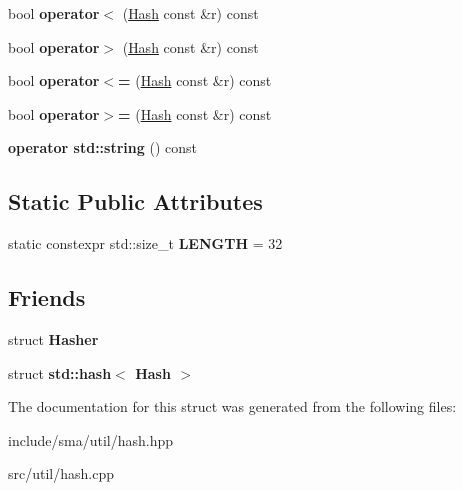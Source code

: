 \begin{DoxyCompactItemize}
\item 
\hypertarget{structsma_1_1Hash_aa811d9fb7dedacd1c4fb6942208f3b10}{bool {\bfseries operator$<$} (\hyperlink{structsma_1_1Hash}{Hash} const \&r) const }\label{structsma_1_1Hash_aa811d9fb7dedacd1c4fb6942208f3b10}

\item 
\hypertarget{structsma_1_1Hash_a15198c79f588abde88bb159708a4cab9}{bool {\bfseries operator$>$} (\hyperlink{structsma_1_1Hash}{Hash} const \&r) const }\label{structsma_1_1Hash_a15198c79f588abde88bb159708a4cab9}

\item 
\hypertarget{structsma_1_1Hash_a2d0c5d092d0007f0a6391559f0a5f722}{bool {\bfseries operator$<$=} (\hyperlink{structsma_1_1Hash}{Hash} const \&r) const }\label{structsma_1_1Hash_a2d0c5d092d0007f0a6391559f0a5f722}

\item 
\hypertarget{structsma_1_1Hash_a7c7a9f933dd3af05335a70a09a53a897}{bool {\bfseries operator$>$=} (\hyperlink{structsma_1_1Hash}{Hash} const \&r) const }\label{structsma_1_1Hash_a7c7a9f933dd3af05335a70a09a53a897}

\item 
\hypertarget{structsma_1_1Hash_a68bbcc1f267c5dc78a7f7005a84d2d1d}{{\bfseries operator std\-::string} () const }\label{structsma_1_1Hash_a68bbcc1f267c5dc78a7f7005a84d2d1d}

\end{DoxyCompactItemize}
\subsection*{Static Public Attributes}
\begin{DoxyCompactItemize}
\item 
\hypertarget{structsma_1_1Hash_a70604fa3eae1c821132295268dc62aef}{static constexpr std\-::size\-\_\-t {\bfseries L\-E\-N\-G\-T\-H} = 32}\label{structsma_1_1Hash_a70604fa3eae1c821132295268dc62aef}

\end{DoxyCompactItemize}
\subsection*{Friends}
\begin{DoxyCompactItemize}
\item 
\hypertarget{structsma_1_1Hash_a50630f6cacf6bbaf65b18c54ef72b343}{struct {\bfseries Hasher}}\label{structsma_1_1Hash_a50630f6cacf6bbaf65b18c54ef72b343}

\item 
\hypertarget{structsma_1_1Hash_a5f6403cd6c7fa0207cf3093a6c1a166f}{struct {\bfseries std\-::hash$<$ Hash $>$}}\label{structsma_1_1Hash_a5f6403cd6c7fa0207cf3093a6c1a166f}

\end{DoxyCompactItemize}


The documentation for this struct was generated from the following files\-:\begin{DoxyCompactItemize}
\item 
include/sma/util/hash.\-hpp\item 
src/util/hash.\-cpp\end{DoxyCompactItemize}
